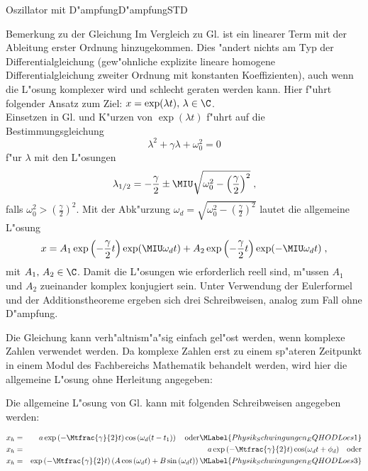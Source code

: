 \begin{MXContent}{Oszillator mit D"ampfung}{D"ampfung}{STD}
  \begin{MHint}{Bemerkung zu der Gleichung}
  Im Vergleich zu Gl.  ist ein linearer Term mit der Ableitung erster Ordnung hinzugekommen. Dies "andert nichts am Typ der Differentialgleichung (gew"ohnliche explizite lineare homogene Differentialgleichung zweiter Ordnung mit konstanten Koeffizienten), auch wenn die L"osung komplexer wird und schlecht geraten werden kann. Hier f"uhrt folgender Ansatz zum Ziel: $x=\exp(\lambda t),\,\lambda\in\C$. \\%
  Einsetzen in Gl.  und K"urzen von $\exp(\lambda t)$ f"uhrt auf die Bestimmungsgleichung 
  \begin{displaymath}
  \lambda^2 + \gamma \lambda + \omega_0^2 = 0
  \end{displaymath}
  f"ur $\lambda$ mit den L"osungen
  \begin{displaymath}
  \lambda_{1/2} = -\frac{\gamma}{2} \pm \MIU \sqrt{\omega_0^2-\left(\frac{\gamma}{2}\right)^2}\; ,
  \end{displaymath}
  falls $\omega_0^2 > \left(\frac{\gamma}{2}\right)^2$. Mit der Abk"urzung $\omega_d = \sqrt{\omega_0^2-\left(\frac{\gamma}{2}\right)^2}$ lautet die allgemeine L"osung
  \begin{displaymath}
  x = A_1 \exp\left(-\frac{\gamma}{2}t\right)\exp(\MIU\omega_d t) + A_2 \exp\left(-\frac{\gamma}{2}t\right)\exp(-\MIU\omega_d t)\; ,
  \end{displaymath}
  mit $A_1,\, A_2\in\C$. Damit die L"osungen wie erforderlich reell sind, m"ussen $A_1$ und $A_2$ zueinander komplex konjugiert sein. Unter Verwendung der Eulerformel und der Additionstheoreme ergeben sich drei Schreibweisen, analog zum Fall ohne D"ampfung.
  \end{MHint}


Die Gleichung kann verh"altnism"a"sig einfach gel"ost werden, wenn komplexe Zahlen verwendet werden. Da komplexe Zahlen erst zu einem sp"ateren Zeitpunkt in einem Modul des Fachbereichs Mathematik behandelt werden, wird hier die allgemeine L"osung ohne Herleitung angegeben:

 \begin{MInfo}
Die allgemeine L"osung von Gl.  kann mit folgenden Schreibweisen angegeben werden:

\begin{eqnarray}
  x_h &=& a\exp\left(-\Mtfrac{\gamma}{2}t\right)\cos\left(\omega_d (t-t_1)\right)\quad\mathrm{oder}\MLabel{Physik_Schwingungen_EQHODLoes1}\\ %
  x_h &=& a\exp\left(-\Mtfrac{\gamma}{2}t\right)\cos(\omega_d t+\phi_d)\quad\mathrm{oder}\\
  x_h &=& \exp\left(-\Mtfrac{\gamma}{2}t\right)\left(A\cos\left(\omega_d t\right)+B\sin\left(\omega_d t\right)\right)\MLabel{Physik_Schwingungen_EQHODLoes3}
\end{eqnarray}


\end{MInfo}
\end{MXContent}

